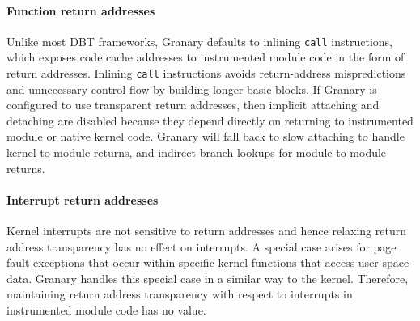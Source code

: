 \documentclass[preprint]{sigplanconf}
\begin{document}


\paragraph{Function return addresses}\label{para:return_address_transparency} Unlike most DBT frameworks, Granary defaults to inlining \texttt{call} instructions, which exposes code cache addresses to instrumented module code in the form of return addresses. Inlining \texttt{call} instructions avoids return-address mispredictions and unnecessary control-flow by building longer basic blocks. If Granary is configured to use transparent return addresses, then implicit attaching and detaching are disabled because they depend directly on returning to instrumented module or native kernel code. Granary will fall back to slow attaching to handle kernel-to-module returns, and indirect branch lookups for module-to-module returns.

\paragraph{Interrupt return addresses} Kernel interrupts are not sensitive to return addresses and hence relaxing return address transparency has no effect on interrupts. A special case arises for page fault exceptions that occur within specific kernel functions that access user space data. Granary handles this special case in a similar way to the kernel. Therefore, maintaining return address transparency with respect to interrupts in instrumented module code has no value.
\end{document}
